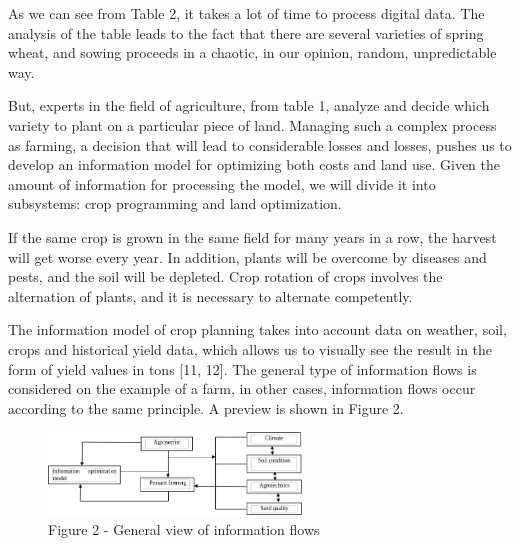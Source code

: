 \begin{multicols}{2}
As we can see from Table 2, it takes a lot of time to process digital
data. The analysis of the table leads to the fact that there are several
varieties of spring wheat, and sowing proceeds in a chaotic, in our
opinion, random, unpredictable way.

But, experts in the field of agriculture, from table 1, analyze and
decide which variety to plant on a particular piece of land. Managing
such a complex process as farming, a decision that will lead to
considerable losses and losses, pushes us to develop an information
model for optimizing both costs and land use. Given the amount of
information for processing the model, we will divide it into subsystems:
crop programming and land optimization.

If the same crop is grown in the same field for many years in a row, the
harvest will get worse every year. In addition, plants will be overcome
by diseases and pests, and the soil will be depleted. Crop rotation of
crops involves the alternation of plants, and it is necessary to
alternate competently.

The information model of crop planning takes into account data on
weather, soil, crops and historical yield data, which allows us to
visually see the result in the form of yield values in tons {[}11,
12{]}. The general type of information flows is considered on the
example of a farm, in other cases, information flows occur according to
the same principle. A preview is shown in Figure 2.
\end{multicols}

\begin{figure}[H]
	\centering
	\includegraphics[width=0.6\textwidth]{assets/1003}
	\caption*{Figure 2 - General view of information flows}
\end{figure}

